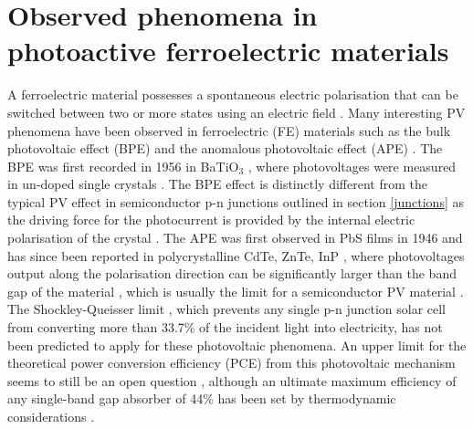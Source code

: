 \documentclass[11pt, twoside]{report}
\begin{document}
\section{Observed phenomena in photoactive ferroelectric materials}\label{ferroPVsection}
A ferroelectric material possesses a spontaneous electric polarisation that can be switched between two or more states using an electric field \cite{new_FE_PV_1}. Many interesting PV phenomena have been observed in ferroelectric (FE) materials such as the bulk photovoltaic effect (BPE) and the anomalous photovoltaic effect (APE) \cite{keith}. 
The BPE was first recorded in 1956 in BaTiO$_3$ \cite{keith_46}, where photovoltages were measured in un-doped single crystals \cite{keith}.
The BPE effect is distinctly different from the typical PV effect in semiconductor
p-n junctions outlined in section \ref{junctions} as the driving force for the photocurrent is provided by the internal electric polarisation of the crystal \cite{FE_PV_rev1}. 
The APE was first observed in PbS films in 1946 \cite{keith_54} and has since been reported in polycrystalline CdTe, ZnTe, InP \cite{keith_55, keith_56, keith_57}, where photovoltages output along the polarisation direction can be significantly larger than the band gap of the material \cite{FE_PV_rev1}, which is usually the limit for a semiconductor PV material \cite{keith}. 
The Shockley-Queisser limit \cite{SQ_1961}, which prevents any single p-n junction solar cell from converting more than 33.7\% of the incident light into electricity, has not been predicted to apply for these photovoltaic phenomena. An upper limit for the theoretical power conversion efficiency (PCE) from this photovoltaic mechanism seems to still be an open question \cite{ FE-PV_kirchartz, new_FE_PV}, although an ultimate maximum efficiency of any single-band gap absorber of 44\% has been set by thermodynamic considerations \cite{SQ_1961}. 
\end{document}
